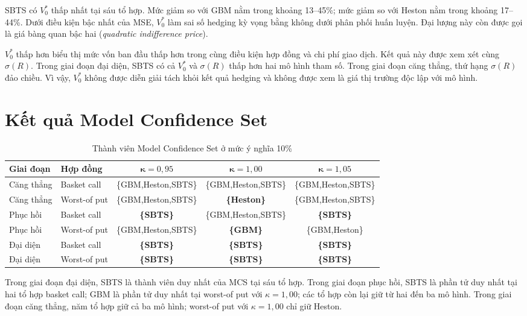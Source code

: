 SBTS có $V_0^{*}$ thấp nhất tại sáu tổ hợp. Mức giảm so với GBM nằm trong
khoảng 13--45\%; mức giảm so với Heston nằm trong khoảng 17--44\%. Dưới điều
kiện bậc nhất của MSE, $V_0^{*}$ làm sai số hedging kỳ vọng bằng không dưới
phân phối huấn luyện. Đại lượng này còn được gọi là giá bàng quan bậc hai
(\textit{quadratic indifference price}).

$V_0^{*}$ thấp hơn biểu thị mức vốn ban đầu thấp hơn trong cùng điều kiện hợp
đồng và chi phí giao dịch. Kết quả này được xem xét cùng $\sigma(R)$. Trong
giai đoạn đại diện, SBTS có cả $V_0^{*}$ và $\sigma(R)$ thấp hơn hai mô hình tham số. Trong
giai đoạn căng thẳng, thứ hạng $\sigma(R)$ đảo chiều. Vì vậy, $V_0^{*}$ không được diễn giải
tách khỏi kết quả hedging và không được xem là giá thị trường độc lập với
mô hình.

\section{Kết quả Model Confidence Set}
\label{sec:c4-mcs}

\begin{table}[H]
\centering
\scriptsize
\setlength{\tabcolsep}{4pt}
\caption{Thành viên Model Confidence Set ở mức ý nghĩa 10\%}
\label{tab:c4-mcs}
\begin{tabular}{@{}llccc@{}}
\toprule
\textbf{Giai đoạn} & \textbf{Hợp đồng} & $\boldsymbol\kappa=0,95$ &
$\boldsymbol\kappa=1,00$ & $\boldsymbol\kappa=1,05$\\
\midrule
Căng thẳng & Basket call & \{GBM,Heston,SBTS\} & \{GBM,Heston,SBTS\} &
\{GBM,Heston,SBTS\}\\
Căng thẳng & Worst-of put & \{GBM,Heston,SBTS\} & \textbf{\{Heston\}} &
\{GBM,Heston,SBTS\}\\
\midrule
Phục hồi & Basket call & \textbf{\{SBTS\}} & \{GBM,Heston,SBTS\} &
\textbf{\{SBTS\}}\\
Phục hồi & Worst-of put & \{GBM,Heston,SBTS\} & \textbf{\{GBM\}} &
\{GBM,Heston\}\\
\midrule
Đại diện & Basket call & \textbf{\{SBTS\}} & \textbf{\{SBTS\}} &
\textbf{\{SBTS\}}\\
Đại diện & Worst-of put & \textbf{\{SBTS\}} & \textbf{\{SBTS\}} &
\textbf{\{SBTS\}}\\
\bottomrule
\end{tabular}
\end{table}

Trong giai đoạn đại diện, SBTS là thành viên duy nhất của MCS tại sáu tổ hợp. Trong
giai đoạn phục hồi, SBTS là phần tử duy nhất tại hai tổ hợp basket call; GBM là phần tử
duy nhất tại worst-of put với $\kappa=1{,}00$; các tổ hợp còn lại giữ từ hai
đến ba mô hình. Trong giai đoạn căng thẳng, năm tổ hợp giữ cả ba mô hình; worst-of put với
$\kappa=1{,}00$ chỉ giữ Heston.

